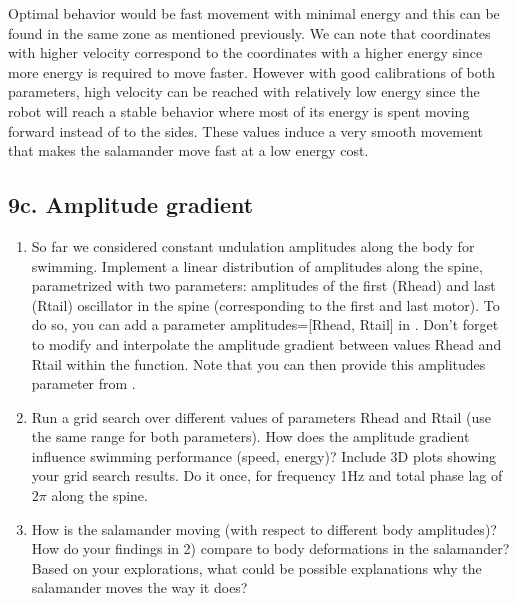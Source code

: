 \documentclass{cmc}
\begin{document}
Optimal behavior would be fast movement with minimal energy and this can be found in the same zone as mentioned previously. We can note that coordinates with higher velocity correspond to the coordinates with a higher energy since more energy is required to move faster. However with good calibrations of both parameters, high velocity can be reached with relatively low energy since the robot will reach a stable behavior where most of its energy is spent moving forward instead of to the sides. These values induce a very smooth movement that makes the salamander move fast at a low energy cost.



\subsection*{9c. Amplitude gradient}
\label{sec:amplitude-gradient}

\begin{enumerate}
\item So far we considered constant undulation amplitudes along the body for
  swimming. Implement a linear distribution of amplitudes along the spine,
  parametrized with two parameters: amplitudes of the first (Rhead) and last
  (Rtail) oscillator in the spine (corresponding to the first and last
  motor). To do so, you can add a parameter amplitudes=[Rhead, Rtail] in
  . Don't forget to modify
  \-
  and interpolate the amplitude gradient between values Rhead and Rtail within
  the function. Note that you can then provide this amplitudes parameter from
  .
\item Run a grid search over different values of parameters Rhead and
  Rtail (use the same range for both parameters). How does the
  amplitude gradient influence swimming performance (speed, energy)?
  Include 3D plots showing your grid search results. Do it once, for
  frequency 1Hz and total phase lag of $2\pi$ along the spine.
  

  
\item How is the salamander moving (with respect to different body
  amplitudes)?  How do your findings in 2) compare to body
  deformations in the salamander?  Based on your explorations, what
  could be possible explanations why the salamander moves the way it
  does?
\end{enumerate}
\end{document}

